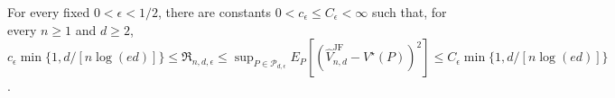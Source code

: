 For every fixed \(0<\epsilon<1/2\), there are constants \(0<c_\epsilon\leq C_\epsilon<\infty\) such that, for every \(n\geq1\) and \(d\geq2\), \(c_\epsilon\min\{1,d/[n\log(ed)]\}\leq\mathfrak R_{n,d,\epsilon}\leq\sup_{P\in\mathcal P_{d,\epsilon}}E_P[(\widehat V_{n,d}^{\mathrm{JF}}-V^\star(P))^2]\leq C_\epsilon\min\{1,d/[n\log(ed)]\}\).